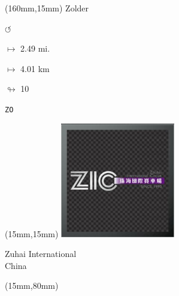 \begin{textblock*}{40mm}(160mm,15mm)%
Zolder
\par \Huge$\circlearrowleft$
\Large
\par$\mapsto$ 2.49 mi.
\par$\mapsto$ 4.01 km
\par$\looparrowright$ 10
\par\hfill\tiny\tt ZO\\
\end{textblock*}
\null\newpage

\begin{textblock*}{50mm}(15mm,15mm)%
\includegraphics[width=50mm]{LG/2015-05-20_00099.png}
\par Zuhai International\\ China
\end{textblock*}
\begin{textblock*}{185mm}(15mm,80mm)%
\end{textblock*}
